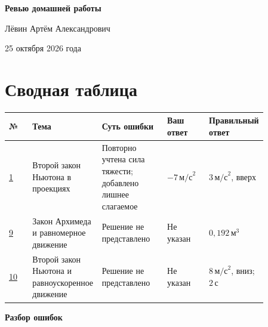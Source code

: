 \documentclass[12pt,a4paper]{article}
\newcommand{\mathunit}[1]{\,\text{#1}}
\begin{document}
\thispagestyle{empty}
\vspace*{0.26\textheight}
\begin{center}
{\Huge\bfseries Ревью домашней работы\par}
\vspace{2.2cm}
{\large Лёвин Артём Александрович\par}
\vspace{0.65cm}
{\large 25 октября 2026 года\par}
\end{center}
\vfill
\begin{center}
\end{center}
\newpage
\section*{Сводная таблица}
\small
\renewcommand{\arraystretch}{1.4}
\begin{tabular}{@{}>{\raggedright\arraybackslash}p{0.09\linewidth}>{\raggedright\arraybackslash}p{0.18\linewidth}>{\raggedright\arraybackslash}p{0.25\linewidth}>{\raggedright\arraybackslash}p{0.16\linewidth}>{\raggedright\arraybackslash}p{0.18\linewidth}@{}}
\toprule
\textbf{№} & \textbf{Тема} & \textbf{Суть ошибки} & \textbf{Ваш ответ} & \textbf{Правильный ответ} \\
\midrule
\hyperref[task:1]{1} & Второй закон Ньютона в проекциях & Повторно учтена сила тяжести; добавлено лишнее слагаемое & $-7\,\text{м/с}^{2}$ & $3\,\text{м/с}^{2}$, вверх \\
\addlinespace
\hyperref[task:9]{9} & Закон Архимеда и равномерное движение & Решение не представлено & Не указан & $0{,}192\,\text{м}^{3}$ \\
\addlinespace
\hyperref[task:10]{10} & Второй закон Ньютона и равноускоренное движение & Решение не представлено & Не указан & $8\,\text{м/с}^{2}$, вниз; $2\mathunit{с}$ \\
\bottomrule
\end{tabular}
\normalsize
\vfill
{}
\newpage
\thispagestyle{empty}
\null\vfill
\begin{center}
{\Huge\bfseries Разбор ошибок}
\end{center}
\vfill\null
\newpage
\end{document}
